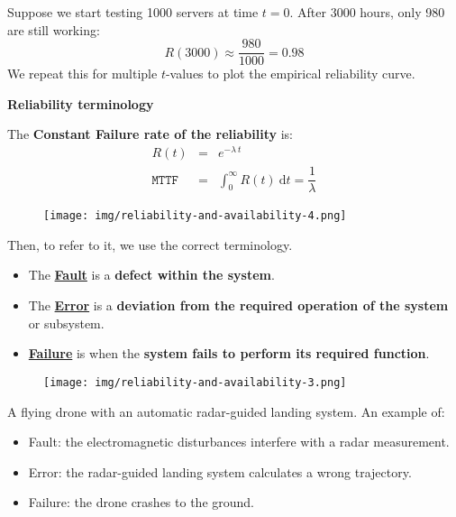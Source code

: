 \highspace
\begin{examplebox}
    Suppose we start testing 1000 servers at time $t = 0$. After 3000 hours, only 980 are still working:
    \begin{equation*}
        R(3000) \approx \dfrac{980}{1000} = 0.98
    \end{equation*}
    We repeat this for multiple $t$-values to plot the empirical reliability curve.
\end{examplebox}

\newpage\newpage\newpage\newpage\newpage\newpage

\begin{flushleft}
    \textcolor{Red2}{ \textbf{Reliability terminology}}
\end{flushleft}
The \textbf{Constant Failure rate of the reliability} is:
\begin{equation}
    \begin{array}{rcl}
        R\left(t\right) &=& e^{-\lambda \: t} \\ [.5em]
        \texttt{MTTF} &=& \displaystyle\int_{0}^{\infty} R\left(t\right) \:\mathrm{d}t = \dfrac{1}{\lambda}
    \end{array}
\end{equation}
\begin{figure}[!htp]
    \centering
    \texttt{[image: img/reliability-and-availability-4.png]}
\end{figure}

\noindent
Then, to refer to it, we use the correct terminology.
\begin{itemize}
    \item The \underline{\textbf{Fault}} is a \textbf{defect within the system}.
    \item The \underline{\textbf{Error}} is a \textbf{deviation from the required operation of the system} or subsystem.
    \item \underline{\textbf{Failure}} is when the \textbf{system fails to perform its required function}.
\end{itemize}
\begin{figure}[!htp]
    \centering
    \texttt{[image: img/reliability-and-availability-3.png]}
\end{figure}

\begin{examplebox}
    A flying drone with an automatic radar-guided landing system. An example of:
    \begin{itemize}
        \item Fault: the electromagnetic disturbances interfere with a radar measurement.
        \item Error: the radar-guided landing system calculates a wrong trajectory.
        \item Failure: the drone crashes to the ground.
    \end{itemize}
\end{examplebox}

